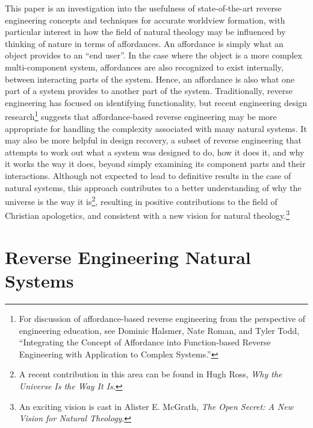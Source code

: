 This paper is an investigation into the usefulness of state-of-the-art
reverse engineering concepts and techniques for accurate worldview
formation, with particular interest in how the field of natural
theology may be influenced by thinking of nature in terms of
affordances. An affordance is simply what an object provides to an “end
user”. In the case where the object is a more complex multi-component
system, affordances are also recognized to exist internally, between
interacting parts of the system. Hence, an affordance is also what one
part of a system provides to another part of the system. Traditionally,
reverse engineering has focused on identifying functionality, but
recent engineering design research\citep[][pgs. 34--37]{maier2008}\footnote{
For
discussion of affordance-based reverse engineering from the perspective
of engineering education, see Dominic Halsmer, Nate Roman, and Tyler
Todd, “Integrating the Concept of Affordance into Function-based
Reverse Engineering with Application to Complex Systems.”\citep{halsmeretal2009}
} suggests that
affordance-based reverse engineering may be more appropriate for
handling the complexity associated with many natural systems. It may
also be more helpful in design recovery, a subset of reverse
engineering that attempts to work out what a system was designed to do,
how it does it, and why it works the way it does, beyond simply
examining its component parts and their interactions. Although not
expected to lead to definitive results in the case of natural systems,
this approach contributes to a better understanding of why the universe
is the way it is\footnote{
A recent contribution in this area can be found in
Hugh Ross, \textit{Why the Universe Is the Way It Is}.\citep{ross2008}
}, resulting in positive
contributions to the field of Christian apologetics, and consistent
with a new vision for natural theology.\footnote{
An exciting vision is cast in Alister E. McGrath,
\textit{The Open Secret: A New Vision for Natural Theology}.\citep{mcgrath2008}
}

\section{Reverse Engineering Natural Systems}

